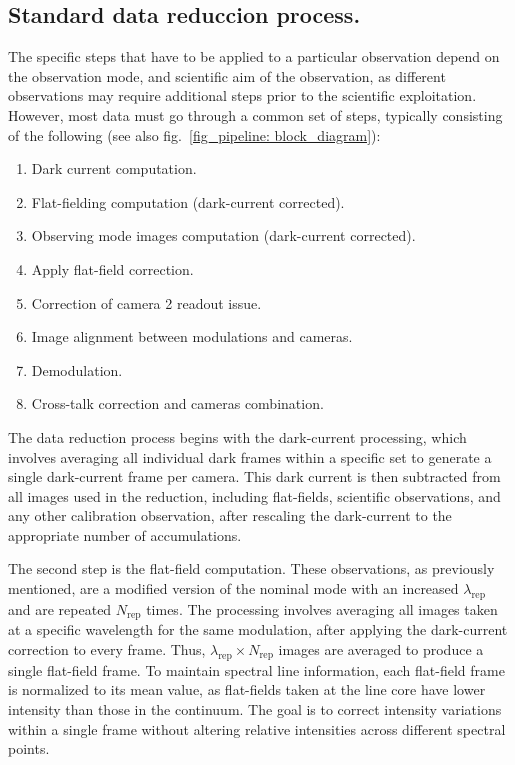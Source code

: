 \subsection{Standard data reduccion process.}

The specific steps that have to be applied to a particular observation depend on the observation mode, and scientific aim of the observation, as different observations  may require additional steps prior to the scientific exploitation. However, most data must go through a common set of steps, typically consisting of the following (see also fig.~\ref{fig_pipeline: block_diagram}):

\begin{enumerate}
  \item Dark current computation. 
  \item Flat-fielding computation (dark-current corrected).
  \item Observing mode images computation (dark-current corrected). 
  \item Apply flat-field correction.
  \item Correction of camera 2 readout issue.
  \item Image alignment between modulations and cameras. 
  \item Demodulation. 
  \item Cross-talk correction and cameras combination.
\end{enumerate}

The data reduction process begins with the dark-current processing, which involves averaging all individual dark frames within a specific set to generate a single dark-current frame per camera. This dark current is then subtracted from all images used in the reduction, including flat-fields, scientific observations, and any other calibration observation, after rescaling the dark-current to the appropriate number of accumulations.

The second step is the flat-field computation. These observations, as previously mentioned, are a modified version of the nominal mode with an increased $\lambda_{\text{rep}}$ and are repeated $N_{\text{rep}}$ times. The processing involves averaging all images taken at a specific wavelength for the same modulation, after applying the dark-current correction to every frame. Thus, $\lambda_{\text{rep}} \times N_{\text{rep}}$ images are averaged to produce a single flat-field frame. To maintain spectral line information, each flat-field frame is normalized to its mean value, as flat-fields taken at the line core have lower intensity than those in the continuum. The goal is to correct intensity variations within a single frame without altering relative intensities across different spectral points.

